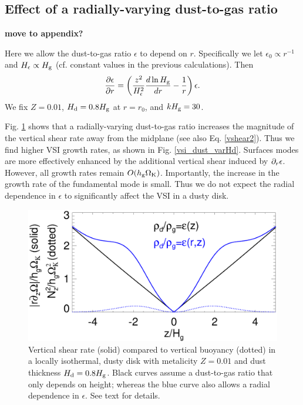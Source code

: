 \subsection{Effect of a radially-varying dust-to-gas ratio}\label{varHd}
{\bf move to appendix?}

Here we allow the dust-to-gas ratio $\epsilon$ to depend on
$r$. Specifically we let $\epsilon_0\propto r^{-1}$ and
$H_\epsilon \propto H_\mathrm{g}$ (cf. constant values in the previous
calculations). Then
\begin{align*}
  \frac{\partial\epsilon}{\partial r} =
  \left(\frac{z^2}{H_\epsilon^2}\frac{d\ln{H_\mathrm{g}}}{dr} -
    \frac{1}{r}\right)\epsilon.   
\end{align*}
We fix $Z=0.01$, $H_\mathrm{d}=0.8H_\mathrm{g}$ at $r=r_0$, and
$kH_\mathrm{g}=30$.      

Fig. \ref{compare_vshear_varHd} shows that a radially-varying
dust-to-gas ratio increases the magnitude of the vertical shear rate
away from the midplane (see also Eq. \ref{vshear2}). Thus we find
higher VSI growth rates, as shown in Fig. \ref{vsi_dust_varHd}. 
Surfaces modes are more effectively enhanced by the additional vertical 
shear induced by $\partial_r\epsilon$. However, all growth rates remain
$O(h_\mathrm{g}\Omega_{\rm K})$. Importantly, the increase in the growth rate of the
fundamental mode is small. Thus we do not expect the radial
dependence in $\epsilon$ to significantly affect the VSI in a dusty
disk. 

\begin{figure}
  \includegraphics[width=\linewidth]{figures/compare_vshear_Nz2_varHd} 
  \caption{Vertical shear rate (solid) compared to vertical buoyancy
    (dotted) in a locally isothermal, dusty disk 
    with metalicity $Z=0.01$ and dust thickness $H_\mathrm{d}=0.8H_\mathrm{g}$.
    Black curves assume a dust-to-gas ratio that only depends on
    height; whereas the blue curve also allows a radial dependence in
    $\epsilon$. See text for details.  
    \label{compare_vshear_varHd}
    }
\end{figure}



